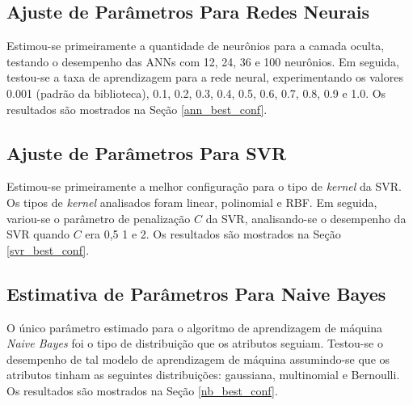 \subsection{Ajuste de Parâmetros Para Redes Neurais}
Estimou-se primeiramente a quantidade de neurônios para a camada oculta, testando o
desempenho das \acrshort{ANN}s com 12, 24, 36 e 100 neurônios.
Em seguida, testou-se a taxa de aprendizagem para a rede neural, experimentando os
valores 0.001 (padrão da biblioteca), 0.1, 0.2, 0.3, 0.4, 0.5, 0.6, 0.7, 0.8, 0.9 e
1.0. Os resultados são mostrados na Seção \ref{ann_best_conf}.

\subsection{Ajuste de Parâmetros Para SVR}
Estimou-se primeiramente a melhor configuração para o tipo de \textit{kernel} da
\acrshort{SVR}. Os tipos de \textit{kernel} analisados foram linear, polinomial e RBF. Em
seguida, variou-se o parâmetro de penalização $C$ da SVR, analisando-se o desempenho da
SVR quando $C$ era 0,5 1 e 2. Os resultados são mostrados na Seção
\ref{svr_best_conf}. 

\subsection{Estimativa de Parâmetros Para Naive Bayes}
O único parâmetro estimado para o algoritmo de aprendizagem de máquina \textit{Naive Bayes} foi
o tipo de distribuição que os atributos seguiam. Testou-se o desempenho de tal modelo
de aprendizagem de máquina assumindo-se que os atributos tinham as seguintes
distribuições: gaussiana, multinomial e Bernoulli. Os resultados são mostrados na
Seção \ref{nb_best_conf}. 

